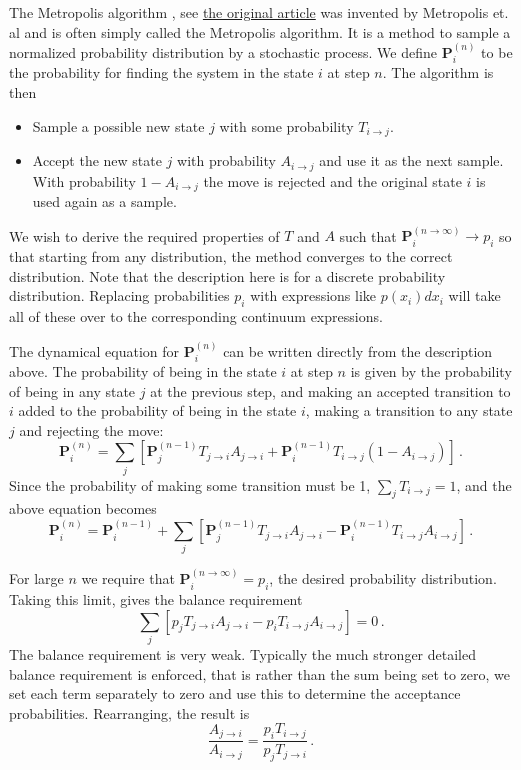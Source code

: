 \documentclass[%
oneside,                 %
final,                   %
10pt]{article}
\begin{document}
The Metropolis algorithm , see \href{{http://scitation.aip.org/content/aip/journal/jcp/21/6/10.1063/1.1699114}}{the original article} was invented by Metropolis et. al
and is often simply called the Metropolis algorithm.
It is a method to sample a normalized probability
distribution by a stochastic process. We define $\mathbf{P}_i^{(n)}$ to
be the probability for finding the system in the state $i$ at step $n$.
The algorithm is then

\begin{itemize}
\item Sample a possible new state $j$ with some probability $T_{i\rightarrow j}$.

\item Accept the new state $j$ with probability $A_{i \rightarrow j}$ and use it as the next sample. With probability $1-A_{i\rightarrow j}$ the move is rejected and the original state $i$ is used again as a sample.
\end{itemize}

\noindent
We wish to derive the required properties of $T$ and $A$ such that
$\mathbf{P}_i^{(n\rightarrow \infty)} \rightarrow p_i$ so that starting
from any distribution, the method converges to the correct distribution.
Note that the description here is for a discrete probability distribution.
Replacing probabilities $p_i$ with expressions like $p(x_i)dx_i$ will
take all of these over to the corresponding continuum expressions.

The dynamical equation for $\mathbf{P}_i^{(n)}$ can be written directly from
the description above. The probability of being in the state $i$ at step $n$
is given by the probability of being in any state $j$ at the previous step,
and making an accepted transition to $i$ added to the probability of
being in the state $i$, making a transition to any state $j$ and
rejecting the move:
\[
\mathbf{P}^{(n)}_i = \sum_j \left [
\mathbf{P}^{(n-1)}_jT_{j\rightarrow i} A_{j\rightarrow i} 
+\mathbf{P}^{(n-1)}_iT_{i\rightarrow j}\left ( 1- A_{i\rightarrow j} \right)
\right ] \,.
\]
Since the probability of making some transition must be 1,
$\sum_j T_{i\rightarrow j} = 1$, and the above equation becomes
\[
\mathbf{P}^{(n)}_i = \mathbf{P}^{(n-1)}_i +
 \sum_j \left [
\mathbf{P}^{(n-1)}_jT_{j\rightarrow i} A_{j\rightarrow i} 
-\mathbf{P}^{(n-1)}_iT_{i\rightarrow j}A_{i\rightarrow j}
\right ] \,.
\]

For large $n$ we require that $\mathbf{P}^{(n\rightarrow \infty)}_i = p_i$,
the desired probability distribution. Taking this limit, gives the
balance requirement
\[
 \sum_j \left [
p_jT_{j\rightarrow i} A_{j\rightarrow i}
-p_iT_{i\rightarrow j}A_{i\rightarrow j}
\right ] = 0 \,.
\]
The balance requirement is very weak. Typically the much stronger detailed
balance requirement is enforced, that is rather than the sum being
set to zero, we set each term separately to zero and use this
to determine the acceptance probabilities. Rearranging, the result is
\[
\frac{ A_{j\rightarrow i}}{A_{i\rightarrow j}}
= \frac{p_iT_{i\rightarrow j}}{ p_jT_{j\rightarrow i}} \,.
\]
\end{document}
